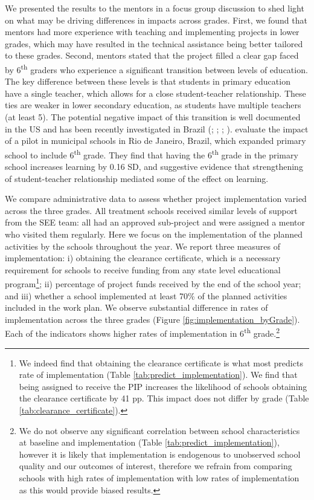 \documentclass[11pt,a4paper]{article}
\begin{document}
We presented the results to the mentors in a focus group discussion to shed light on what may be driving differences in impacts across grades. First, we found that mentors had more experience with teaching and implementing projects in lower grades, which may have resulted in the technical assistance being better tailored to these grades. Second, mentors stated that the project filled a clear gap faced by 6\textsuperscript{th} graders who experience a significant transition between levels of education. The key difference between these levels is that students in primary education have a single teacher, which allows for a close student-teacher relationship. These ties are weaker in lower secondary education, as students have multiple teachers (at least 5). The potential negative impact of this transition is well documented in the US and has been recently investigated in Brazil (\citealp{bedard2005middle}; \citealp{cook2006should}; \citealp{hanewald2013transition}; \citealp{Santos2017}). \cite{Santos2017} evaluate the impact of a pilot in municipal schools in Rio de Janeiro, Brazil, which expanded primary school to include  6\textsuperscript{th} grade. They find that having the 6\textsuperscript{th} grade in the primary school increases learning by 0.16 SD, and suggestive evidence that strengthening of student-teacher relationship mediated some of the effect on learning.  

We compare administrative data to assess whether project implementation varied across the three grades. All treatment schools received similar levels of support from the SEE team: all had an approved sub-project and were assigned a mentor who visited them regularly. Here we focus on the implementation of the planned activities by the schools throughout the year. We report three measures of implementation: i) obtaining the clearance certificate, which is a necessary requirement for schools to receive funding from any state level educational program\footnote{We indeed find that obtaining the clearance certificate is what most predicts rate of implementation (Table \ref{tab:predict_implementation}). We find that being assigned to receive the PIP increases the likelihood of schools obtaining the clearance certificate by 41 pp. This impact does not differ by grade (Table \ref{tab:clearance_certificate}).}; ii) percentage of project funds received by the end of the school year; and iii) whether a school implemented at least 70\% of the planned activities included in the work plan. We observe substantial difference in rates of implementation across the three grades (Figure \ref{fig:implementation_byGrade}). Each of the indicators shows higher rates of implementation in 6\textsuperscript{th} grade.\footnote{We do not observe any significant correlation between school characteristics at baseline and implementation (Table \ref{tab:predict_implementation}), however it is likely that implementation is endogenous to unobserved school quality and our outcomes of interest, therefore we refrain from comparing schools with high rates of implementation with low rates of implementation as this would provide biased results.} 
\end{document}
